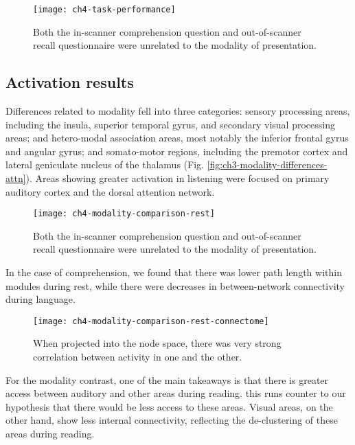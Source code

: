\begin{figure}[t]
	\centering
	\texttt{[image: ch4-task-performance]}
    \caption[Behavioral metrics of passage performance were unrelated to modality.]{Both the in-scanner comprehension question and out-of-scanner recall questionnaire were unrelated to the modality of presentation.}
	\label{fig:ch4-task-performance}
\end{figure}


\subsection{Activation results}

Differences related to modality fell into three categories: sensory processing areas, including the insula, superior temporal gyrus, and secondary visual processing areas; and hetero-modal association areas, most notably the inferior frontal gyrus and angular gyrus; and somato-motor regions, including the premotor cortex and lateral geniculate nucleus of the thalamus (Fig. \ref{fig:ch3-modality-differences-attn}). Areas showing greater activation in listening were focused on primary auditory cortex and the dorsal attention network.

\begin{figure}[t]
	\centering
	\texttt{[image: ch4-modality-comparison-rest]}
    \caption[Large overlap between listening and reading activation.]{Both the in-scanner comprehension question and out-of-scanner recall questionnaire were unrelated to the modality of presentation.}
	\label{fig:ch4-modality-comparison-rest}
\end{figure}


In the case of comprehension, we found that there was lower path length within modules during rest, while there were decreases in between-network connectivity during language.

\begin{figure}[t]
	\centering
	\texttt{[image: ch4-modality-comparison-rest-connectome]}
    \caption[Large overlap between listening and reading activation in the connectome space.]{When projected into the node space, there was very strong correlation between activity in one and the other.}
	\label{fig:ch4-modality-comparison-rest-connectome}
\end{figure}

For the modality contrast, one of the main takeaways is that there is greater access between auditory and other areas during reading. this runs counter to our hypothesis that there would be less access to these areas. Visual areas, on the other hand, show less internal connectivity, reflecting the de-clustering of these areas during reading. 

